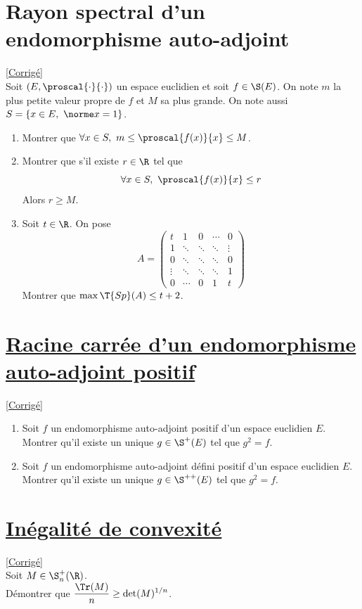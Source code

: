 \documentclass[8pt]{book}
\begin{document}
\section{Rayon spectral d'un endomorphisme auto-adjoint }
\label{Rayon spectral d'un endomorphisme auto-adjoint}
\textcolor{blue}{\hyperref[Rayon spectral d'un endomorphisme auto-adjoint corrigé]{[Corrigé]}}\\
Soit $(E,\proscal{\cdot}{\cdot})$ un espace euclidien et soit $f\in \S(E)$. On note $m$ la plus petite valeur propre de $f$ et $M$ sa plus grande. On note aussi $S=\{x\in E,\ \norme x=1\}$.
\begin{enumerate}
	\item Montrer que $\forall x\in S,\ m\leq \proscal{f(x)}{x}\leq M$.
	\item Montrer que s'il existe $r\in \R$ tel que
	$$\forall x\in S,\ \proscal{f(x)}{x}\leq r$$
	Alors $r\geq M$.
	\item Soit $t\in \R$. On pose
	$$A=\begin{pmatrix}
		t&1&0&\cdots&0\\
		1&\ddots&\ddots&\ddots&\vdots\\
		0&\ddots&\ddots&\ddots&0\\
		\vdots&\ddots&\ddots&\ddots&1\\
		0&\cdots&0&1&t
	\end{pmatrix}$$
	Montrer que $\max\T{Sp}(A)\leq t+2$.
\end{enumerate}

\section{\underline{Racine carrée d'un endomorphisme auto-adjoint positif} }
\label{Racine carrée d'un endomorphisme auto-adjoint positif}
\textcolor{blue}{\hyperref[Racine carrée d'un endomorphisme auto-adjoint positif corrigé]{[Corrigé]}}\\
\begin{enumerate}[leftmargin=*]
	\item Soit $f$ un endomorphisme auto-adjoint positif d'un espace euclidien $E$. Montrer qu'il existe un unique $g\in\S^+(E)$ tel que $g^2=f$.
	\item Soit $f$ un endomorphisme auto-adjoint défini positif d'un espace euclidien $E$. Montrer qu'il existe un unique $g\in\S^{++}(E)$ tel que $g^2=f$.
\end{enumerate}

\section{\underline{Inégalité de convexité} }
\label{Inégalité de convexité}
\textcolor{blue}{\hyperref[Inégalité de convexité corrigé]{[Corrigé]}}\\
Soit $M\in\S^+_n(\R)$.\\
Démontrer que $\displaystyle\frac{\Tr(M)}{n}\geq \det(M)^{1/n}$.
\end{document}
